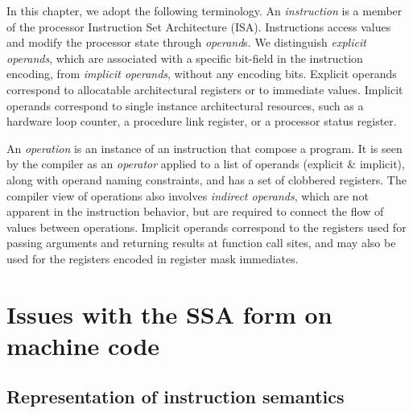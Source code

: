 In this chapter, we adopt the following terminology. An \emph{instruction} is a
member of the processor Instruction Set Architecture (ISA). Instructions access
values and modify the processor state through \emph{operand}s. We distinguish
\emph{explicit operands}, which are associated with a specific bit-field in the
instruction encoding, from \emph{implicit operands}, without any encoding bits.
Explicit operands correspond to allocatable architectural registers or to
immediate values. Implicit operands correspond to single instance architectural
resources, such as a hardware loop counter, a procedure link register, or a
processor status register.

An \emph{operation} is an instance of an instruction that compose a program. It
is seen by the compiler as an \emph{operator} applied to a list of operands
(explicit \& implicit), along with operand naming constraints, and has a set of
clobbered registers. The compiler view of operations also involves
\emph{indirect operands}, which are not apparent in the instruction behavior,
but are required to connect the flow of values between operations.  Implicit
operands correspond to the registers used for passing arguments and returning
results at function call sites, and may also be used for the registers
encoded in register mask immediates.


\section{Issues with the SSA form on machine code}
\label{sec:ssa-codegen-issues}

\subsection{Representation of instruction semantics}

